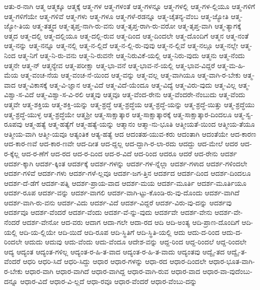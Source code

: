 {ಆತು-ರ-ನಾಗಿ
ಆತ್ಮ
ಆತ್ಮಕ್ಕೂ
ಆತ್ಮಕ್ಕೆ
ಆತ್ಮ-ಗಳ
ಆತ್ಮ-ಗಳಂತೆ
ಆತ್ಮ-ಗಳನ್ನೂ
ಆತ್ಮ-ಗಳಲ್ಲಿ
ಆತ್ಮ-ಗಳ-ಲ್ಲಿಯೂ
ಆತ್ಮ-ಗಳಿಗೆ
ಆತ್ಮ-ಗಳಿಗೆಯೇ
ಆತ್ಮ-ಗಳಿವೆ
ಆತ್ಮ-ಗಳು
ಆತ್ಮ-ಗಳೂ
ಆತ್ಮ-ಗಳೆ-ರಡನ್ನೂ
ಆತ್ಮ-ಚೈತನ್ಯ-ವೆಂಬ
ಆತ್ಮ-ಜ್ಯೋತಿ
ಆತ್ಮ-ಜ್ಯೋ-ತಿಯ
ಆತ್ಮ-ತತ್ತ್ವದ
ಆತ್ಮ-ತೃಪ್ತ-ನಾಗಿ-ರು-ವನು
ಆತ್ಮ-ತೃಪ್ತ-ರಾಗಿ-ರು-ವರೋ
ಆತ್ಮ-ತೃಪ್ತ-ವಾಗಿ
ಆತ್ಮ-ತ್ಯಾಗಕ್ಕೆ
ಆತ್ಮದ
ಆತ್ಮ-ದಲ್ಲಿ
ಆತ್ಮ-ದಲ್ಲಿಯೂ
ಆತ್ಮ-ದಲ್ಲಿ-ರುವ
ಆತ್ಮ-ದಿಂದ
ಆತ್ಮ-ದಿಂದಲೇ
ಆತ್ಮ-ದೊಂದಿಗೆ
ಆತ್ಮನ
ಆತ್ಮ-ನಂತೆ
ಆತ್ಮ-ನನ್ನು
ಆತ್ಮ-ನನ್ನೂ
ಆತ್ಮ-ನಲ್ಲಿ
ಆತ್ಮ-ನ-ಲ್ಲಿದೆ
ಆತ್ಮ-ನ-ಲ್ಲಿ-ರು-ವುವು
ಆತ್ಮ-ನ-ಲ್ಲಿವೆ
ಆತ್ಮ-ನಲ್ಲೂ
ಆತ್ಮ-ನಲ್ಲೇ
ಆತ್ಮ-ನಿಂದ
ಆತ್ಮ-ನಿಗೆ
ಆತ್ಮ-ನಿ-ರು-ವನು
ಆತ್ಮ-ನಿ-ರುವನೇ
ಆತ್ಮ-ನಿರುವಿಕೆ-ಯಲ್ಲಿ
ಆತ್ಮ-ನಿರು-ವುದು
ಆತ್ಮನು
ಆತ್ಮ-ನೆಂದು
ಆತ್ಮನೇ
ಆತ್ಮ-ನ್
ಆತ್ಮನ್ಯೇವ
ಆತ್ಮ-ಪರೀಕ್ಷಾ
ಆತ್ಮ-ಭಾ-ವನೆ
ಆತ್ಮ-ಭಾವ-ನೆ-ಯಲ್ಲಿ
ಆತ್ಮ-ಭಾವ-ವಿದ್ದರೆ
ಆತ್ಮ-ಮ-ಹಿ-ಮೆಯ
ಆತ್ಮ-ವಂಚ-ನೆಯ
ಆತ್ಮ-ವಂಚ-ನೆ-ಯಿಂದ
ಆತ್ಮ-ವನ್ನು
ಆತ್ಮ-ವಲ್ಲ
ಆತ್ಮ-ವಾಗಿಯೂ
ಆತ್ಮ-ವಾಗಿ-ರ-ಬೇಕು
ಆತ್ಮ-ವಾದ
ಆತ್ಮ-ವಿಕಾಸಕ್ಕೆ
ಆತ್ಮ-ವಿ-ಜ್ಞಾನ
ಆತ್ಮ-ವಿದೆ
ಆತ್ಮ-ವಿದೆ-ಯೆಂದೂ
ಆತ್ಮ-ವಿದ್ಯೆ
ಆತ್ಮ-ವಿರು-ವುದು
ಆತ್ಮ-ವಿಲ್ಲ
ಆತ್ಮ-ವಿಶ್ವಾ-ಸ-ವಿದೆ
ಆತ್ಮ-ವಿಶ್ವಾ-ಸ-ವಿ-ರಲಿ
ಆತ್ಮವು
ಆತ್ಮವೂ
ಆತ್ಮ-ವೆಂದ-ರೇನು
ಆತ್ಮ-ವೆಂದರೇ-ನೆಂಬುದು
ಆತ್ಮ-ವೆಂದು
ಆತ್ಮವೇ
ಆತ್ಮ-ಶಕ್ತಿಯ
ಆತ್ಮ-ಶಕ್ತಿ-ಯನ್ನು
ಆತ್ಮ-ಶ್ರದ್ಧೆ
ಆತ್ಮ-ಶ್ರದ್ಧೆಯ
ಆತ್ಮ-ಶ್ರದ್ಧೆ-ಯನ್ನು
ಆತ್ಮ-ಶ್ರದ್ಧೆ-ಯಿತ್ತು
ಆತ್ಮ-ಶ್ರದ್ಧೆಯು
ಆತ್ಮ-ಶ್ರದ್ಧೆ-ಯುಳ್ಳ
ಆತ್ಮ-ಶ್ರದ್ಧೆಯೇ
ಆತ್ಮಶ್ರೀ
ಆತ್ಮ-ಸಾಕ್ಷಾತ್ಕಾರ
ಆತ್ಮ-ಸಾಕ್ಷಾತ್ಕಾರಕ್ಕೆ
ಆತ್ಮ-ಸಾಕ್ಷಾತ್ಕಾರ-ದಿಂದಲೂ
ಆತ್ಮ-ಸ್ವ-ರೂಪವು
ಆತ್ಮ-ಹತ್ಯೆ
ಆತ್ಮ-ಹತ್ಯೆಗೆ
ಆತ್ಮ-ಹತ್ಯೆ-ಯನ್ನು
ಆತ್ಮಾನಂ
ಆತ್ಮಾ-ನು-ಭೂತಿ
ಆತ್ಮೀಯತೆ-ಯಿಂದ
ಆತ್ಮೀಯ-ತೆಯೂ
ಆತ್ಮೀಯ-ವಾಗಿ
ಆತ್ಮೀ-ಯವೂ
ಆತ್ಯಂತಿಕ
ಆತ್ಯ-ಹತ್ಯೆ
ಆದ
ಆದಂತಹ-ಯುವ-ಕರು
ಆದಂತಾಗಿ
ಆದಂತೆಯೇ
ಆದ-ಕಾರಣ
ಆದ-ಕಾರ-ಣವೆ
ಆದ-ಕಾರ-ಣವೇ
ಆದ-ದೀತ
ಆದ-ದ್ದಲ್ಲ
ಆದ-ದ್ದಾಗಿ-ರ-ಲಾ-ರದು
ಆದದ್ದು
ಆದ-ಮೇಲೆ
ಆದರ
ಆದ-ರ-ಕ್ಕೆಲ್ಲ
ಆದ-ರ-ಣೆಗೆ
ಆದ-ರದ
ಆದ-ರ-ದಿಂದ
ಆದ-ರ-ವಿದೆ
ಆದ-ರಿಂದ
ಆದರೂ
ಆದರೆ
ಆದ-ರೇನು
ಆದರ್ಶ
ಆದರ್ಶ-ಕ್ಕಾಗಿ
ಆದರ್ಶ-ಕ್ಕಿಂತ
ಆದರ್ಶಕ್ಕೆ
ಆದರ್ಶ-ಗಳನ್ನು
ಆದರ್ಶ-ಗಳ-ನ್ನೆಲ್ಲಾ
ಆದರ್ಶ-ಗಳಾದ
ಆದರ್ಶ-ಗಳಿಂದಲೇ
ಆದರ್ಶ-ಗಳಿವೆ
ಆದರ್ಶ-ಗಳು
ಆದರ್ಶ-ಗಳೆ-ಲ್ಲವೂ
ಆದರ್ಶ-ಜಗ-ತ್ತಿನ
ಆದರ್ಶದ
ಆದರ್ಶ-ದಿಂದ
ಆದರ್ಶ-ದಿಂದಲೂ
ಆದರ್ಶ-ದೆ-ಡೆಗೆ
ಆದರ್ಶ-ಪತ್ನಿ
ಆದರ್ಶ-ಪ್ರಾಯ-ವಾದ
ಆದರ್ಶ-ಮಯ
ಆದರ್ಶ-ಮೂರ್ತಿ
ಆದರ್ಶ-ಮೂರ್ತಿಯೂ
ಆದರ್ಶ-ರೂಪ
ಆದರ್ಶ-ವನ್ನು
ಆದರ್ಶ-ವಾಗಲಿ
ಆದರ್ಶ-ವಾಗಿ-ಟ್ಟು-ಕೊಂಡಿ-ರು-ವು-ದೊಂದು
ಆದರ್ಶ-ವಾಗಿದೆ
ಆದರ್ಶ-ವಾಗಿ-ರು-ವನು
ಆದರ್ಶ-ವಿದು
ಆದರ್ಶ-ವಿದೆ
ಆದರ್ಶ-ವಿದ್ದರೆ
ಆದರ್ಶ-ವಿರು-ವು-ದನ್ನು
ಆದರ್ಶವು
ಆದರ್ಶವೂ
ಆದರ್ಶ-ವೆಂದರೆ
ಆದರ್ಶ-ವೆಂದು
ಆದರ್ಶ-ವೆ-ನ್ನು-ವುದು
ಆದರ್ಶವೇ
ಆದರ್ಶ-ವೇನು
ಆದರ್ಶ-ವೇ-ನೆಂದರೆ
ಆದರ್ಶ-ವೇನೋ
ಆದ-ವರು
ಆದಾಗ
ಆದಾ-ಗಲೇ
ಆದಾ-ರದ
ಆದಿ
ಆದಿ-ಅಂತ್ಯ
ಆದಿ-ಪ್ರಾಣ-ದೊಂದಿಗೆ
ಆದಿ-ಯಲ್ಲಿ
ಆದಿ-ಯ-ಲ್ಲಿಯೇ
ಆದಿ-ಯಿದೆ
ಆದಿ-ರೂಪ
ಆದಿ-ಸ್ಥಿತಿಗೆ
ಆದಿ-ಸ್ಥಿತಿ-ಯಲ್ಲಿ
ಆದು
ಆದು-ದ-ರಿಂದ
ಆದು-ದ-ರಿಂದಲೇ
ಆದುದು
ಆದುವು
ಆದು-ವೆಂದು
ಆದು-ವೆಂದೂ
ಆದೇಶ-ವನ್ನು
ಆದ್ದ-ರಿಂದ
ಆದ್ದ-ರಿಂದಲೆ
ಆದ್ದ-ರಿಂದಲೇ
ಆದ್ಯ
ಆದ್ಯಂತ
ಆದ್ಯಂತ-ಗಳಿಲ್ಲ
ಆದ್ಯಂತ-ರ-ಹಿ-ತ-ವಾದ
ಆದ್ಯಂತ-ರ-ಹಿ-ತ-ವಾದು
ಆದ್ಯಂತವು
ಆದ್ವೈ-ತದ
ಆದ್ವೈ-ತ-ವೆಂದರೆ
ಆಧರಿ
ಆಧರಿ-ಸಿದೆ
ಆಧರಿ-ಸಿದ್ದು
ಆಧಾರ
ಆಧಾರ-ಗಳನ್ನು
ಆಧಾ-ರದ
ಆಧಾರ-ದಿಂದಲೇ
ಆಧಾರ-ಭೂತ-ವಾಗಿ-ರ-ಬೇಕು
ಆಧಾರ-ವಾಗಿ
ಆಧಾರ-ವಾಗಿದೆ
ಆಧಾರ-ವಾಗಿದ್ದ
ಆಧಾರ-ವಾಗಿ-ರುವ
ಆಧಾರ-ವಾದ
ಆಧಾರ-ವಾ-ವುದೆಂಬು-ದನ್ನೂ
ಆಧಾರ-ವಿದೆ
ಆಧಾರ-ವಿ-ಲ್ಲದೆ
ಆಧಾ-ರವೂ
ಆಧಾರ-ವೆಂದರೆ
ಆಧಾರ-ವೆಂಬು-ದನ್ನು
}
